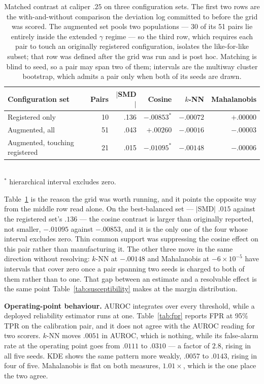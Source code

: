 \documentclass[11pt,a4paper]{article}
\begin{document}
\begin{table}[t]
\centering
\caption{Matched contrast at caliper $.25$ on three configuration sets. The first two rows are the with-and-without comparison the deviation log committed to before the grid was scored. The augmented set pools two populations --- 30 of its 51 pairs lie entirely inside the extended $\gamma$ regime --- so the third row, which requires each pair to touch an originally registered configuration, isolates the like-for-like subset; that row was defined after the grid was run and is post hoc. Matching is blind to seed, so a pair may span two of them; intervals are the multiway cluster bootstrap, which admits a pair only when both of its seeds are drawn.}
\label{tab:support}
\small
\begin{tabular}{lrrrrr}
\toprule
Configuration set & Pairs & $|$SMD$|$ & Cosine & $k$-NN & Mahalanobis\\
\midrule
Registered only & 10 & .136 & $-.00853^\ast$ & $-.00072$ & $+.00000$\\
Augmented, all & 51 & .043 & $+.00260$ & $-.00016$ & $-.00003$\\
Augmented, touching registered & 21 & .015 & $-.01095^\ast$ & $-.00148$ & $-.00006$\\
\bottomrule
\end{tabular}
\\[2pt]
\footnotesize $^\ast$ hierarchical interval excludes zero.
\end{table}

Table~\ref{tab:support} is the reason the grid was worth running, and it points
the opposite way from the middle row read alone. On the best-balanced set ---
$|$SMD$|$ $.015$ against the registered set's $.136$ --- the cosine contrast is
larger than originally reported, not smaller, $-.01095$ against $-.00853$, and
it is the only one of the four whose interval excludes zero. Thin common support
was suppressing the cosine effect on this pair rather than manufacturing it. The
other three move in the same direction without resolving: $k$-NN at $-.00148$
and Mahalanobis at $-6\times10^{-5}$ have intervals that cover zero once a pair
spanning two seeds is charged to both of them rather than to one. That gap
between an estimate and a resolvable effect is the same point
Table~\ref{tab:susceptibility} makes at the margin distribution.

\textbf{Operating-point behaviour.} AUROC integrates over every threshold,
while a deployed reliability estimator runs at one. Table~\ref{tab:fpr} reports
FPR at 95\% TPR on the calibration pair, and it does not agree with the AUROC
reading for two scorers. $k$-NN moves $.0051$ in AUROC, which is nothing, while
its false-alarm rate at the operating point goes from $.0111$ to $.0310$ --- a
factor of $2.8$, rising in all five seeds. KDE shows the same pattern more
weakly, $.0057$ to $.0143$, rising in four of five. Mahalanobis is flat on both
measures, $1.01\times$, which is the one place the two agree.
\end{document}
